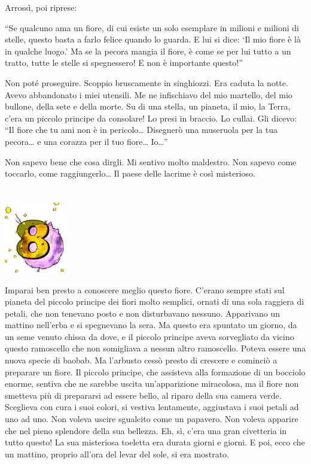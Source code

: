 \documentclass[11pt]{scrbook}
\begin{document}
Arrossì, poi riprese:

``Se qualcuno ama un fiore, di cui esiste un solo esemplare in milioni e milioni di stelle, questo basta a farlo felice quando lo guarda. E lui si dice: `Il mio fiore è là in qualche luogo.' Ma se la pecora mangia il fiore, è come se per lui tutto a un tratto, tutte le stelle si spegnessero! E non è importante questo!''

Non poté proseguire. Scoppio bruscamente in singhiozzi. Era caduta la notte. Avevo abbandonato i miei utensili. Me ne infischiavo del mio martello, del mio bullone, della sete e della morte. Su di una stella, un pianeta, il mio, la Terra, c'era un piccolo principe da consolare! Lo presi in braccio. Lo cullai. Gli dicevo: ``Il fiore che tu ami non è in pericolo\ldots{} Disegnerò una museruola per la tua pecora\ldots{} e una corazza per il tuo fiore\ldots{} Io\ldots{}''

Non sapevo bene che cosa dirgli. Mi sentivo molto maldestro. Non sapevo come toccarlo, come raggiungerlo\ldots{} Il paese delle lacrime è così misterioso.

\chapter{}
\begin{center}
\includegraphics{img/chapter8}
\end{center}

Imparai ben presto a conoscere meglio questo fiore. C'erano sempre stati sul pianeta del piccolo principe dei fiori molto semplici, ornati di una sola raggiera di petali, che non tenevano posto e non disturbavano nessuno. Apparivano un mattino nell'erba e si spegnevano la sera. Ma questo era spuntato un giorno, da un seme venuto chissa da dove, e il piccolo principe aveva sorvegliato da vicino questo ramoscello che non somigliava a nessun altro ramoscello. Poteva essere una nuova specie di baobab. Ma l'arbusto cessò presto di crescere e cominciò a preparare un fiore. Il piccolo principe, che assisteva alla formazione di un bocciolo enorme, sentiva che ne sarebbe uscita un'apparizione miracolosa, ma il fiore non smetteva più di prepararsi ad essere bello, al riparo della sua camera verde. Sceglieva con cura i suoi colori, si vestiva lentamente, aggiustava i suoi petali ad uno ad uno. Non voleva uscire sgualcito come un papavero. Non voleva apparire che nel pieno splendore della sua bellezza. Eh, sì, c'era una gran civetteria in tutto questo! La sua misteriosa toeletta era durata giorni e giorni. E poi, ecco che un mattino, proprio all'ora del levar del sole, si era mostrato.
\end{document}
